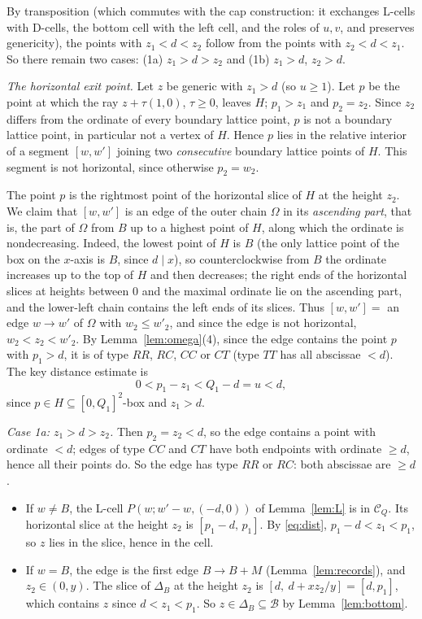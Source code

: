 By transposition (which commutes with the cap construction: it exchanges L-cells with D-cells, the bottom cell with the left cell, and the roles of $u,v$, and preserves genericity), the points with $z_1<d<z_2$ follow from the points with $z_2<d<z_1$. So there remain two cases: (1a) $z_1>d>z_2$ and (1b) $z_1>d$, $z_2>d$.

\emph{The horizontal exit point.} Let $z$ be generic with $z_1>d$ (so $u\ge1$). Let $p$ be the point at which the ray $z+\tau(1,0)$, $\tau\ge0$, leaves $H$; $p_1>z_1$ and $p_2=z_2$. Since $z_2$ differs from the ordinate of every boundary lattice point, $p$ is not a boundary lattice point, in particular not a vertex of $H$. Hence $p$ lies in the relative interior of a segment $[w,w']$ joining two \emph{consecutive} boundary lattice points of $H$. This segment is not horizontal, since otherwise $p_2=w_2$.

The point $p$ is the rightmost point of the horizontal slice of $H$ at the height $z_2$. We claim that $[w,w']$ is an edge of the outer chain $\Omega$ in its \emph{ascending part}, that is, the part of $\Omega$ from $B$ up to a highest point of $H$, along which the ordinate is nondecreasing. Indeed, the lowest point of $H$ is $B$ (the only lattice point of the box on the $x$-axis is $B$, since $d\mid x$), so counterclockwise from $B$ the ordinate increases up to the top of $H$ and then decreases; the right ends of the horizontal slices at heights between $0$ and the maximal ordinate lie on the ascending part, and the lower-left chain contains the left ends of its slices. Thus $[w,w']=$ an edge $w\to w'$ of $\Omega$ with $w_2\le w'_2$, and since the edge is not horizontal, $w_2<z_2<w'_2$. By Lemma~\ref{lem:omega}(4), since the edge contains the point $p$ with $p_1>d$, it is of type $RR$, $RC$, $CC$ or $CT$ (type $TT$ has all abscissae $<d$). The key distance estimate is
\begin{equation}\label{eq:dist}
  0<p_1-z_1<Q_1-d=u<d,
\end{equation}
since $p\in H\subseteq[0,Q_1]^2$-box and $z_1>d$.

\emph{Case 1a: $z_1>d>z_2$.} Then $p_2=z_2<d$, so the edge contains a point with ordinate $<d$; edges of type $CC$ and $CT$ have both endpoints with ordinate $\ge d$, hence all their points do. So the edge has type $RR$ or $RC$: both abscissae are $\ge d$.
\begin{itemize}
\item If $w\ne B$, the L-cell $P(w;w'-w,(-d,0))$ of Lemma~\ref{lem:L} is in $\mathcal C_Q$. Its horizontal slice at the height $z_2$ is $[p_1-d,\,p_1]$. By \eqref{eq:dist}, $p_1-d<z_1<p_1$, so $z$ lies in the slice, hence in the cell.
\item If $w=B$, the edge is the first edge $B\to B+M$ (Lemma~\ref{lem:records}), and $z_2\in(0,y)$. The slice of $\Delta_B$ at the height $z_2$ is $[d,\ d+xz_2/y]=[d,p_1]$, which contains $z$ since $d<z_1<p_1$. So $z\in\Delta_B\subseteq\mathcal B$ by Lemma~\ref{lem:bottom}.
\end{itemize}

